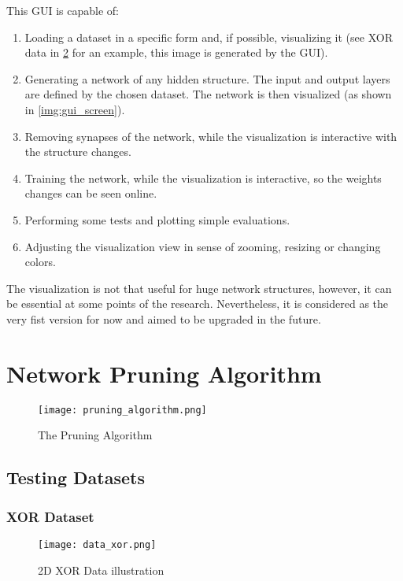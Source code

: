This GUI is capable of:
\begin{enumerate}
\item Loading a dataset in a specific form and, if possible, visualizing it (see XOR data in \cref{img:data_xor} for an example, this image is generated by the GUI).
\item Generating a network of any hidden structure. The input and output layers are defined by the chosen dataset. The network is then visualized (as shown in \cref{img:gui_screen}).
\item Removing synapses of the network, while the visualization is interactive with the structure changes.
\item Training the network, while the visualization is interactive, so the weights changes can be seen online.
\item Performing some tests and plotting simple evaluations.
\item Adjusting the visualization view in sense of zooming, resizing or changing colors.
\end{enumerate}

The visualization is not that useful for huge network structures, however, it can be essential at some points of the research. Nevertheless, it is considered as the very fist version for now and aimed to be upgraded in the future.

\newpage
\section{Network Pruning Algorithm} \label{sec:network_pruning_algorithm}

\begin{figure}[H]
  \centering
  \texttt{[image: pruning\_algorithm.png]}
  \caption{The Pruning Algorithm}
  \label{img:pruning_algorithm}
\end{figure}

\subsection{Testing Datasets}

\subsubsection*{XOR Dataset}

\begin{figure}[H]
  \centering
  \texttt{[image: data\_xor.png]}
  \caption{2D XOR Data illustration}
  \label{img:data_xor}
\end{figure}

